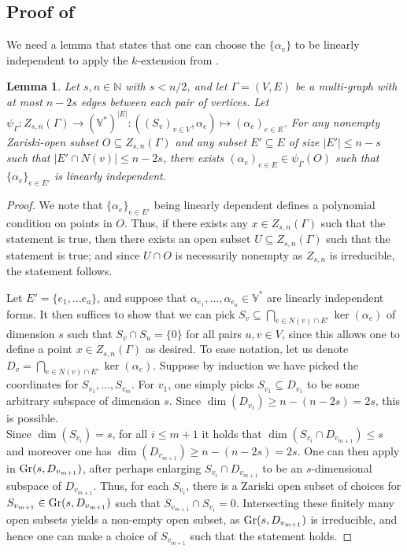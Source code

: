 \documentclass{article}
\newtheorem{lemma}[theorem]{Lemma}
\theoremstyle{definition}
\theoremstyle{remark}
\begin{document}
\subsection{Proof of }
We need a lemma that states that one can choose the $\{\alpha_e\}$ to be linearly independent to apply the $k$-extension from .
\begin{lemma}\label{lem: dense-open -> general position}
    Let $s, n\in \mathbb{N}$ with $s <n/2$, and let $\Gamma=(V, E)$ be a multi-graph with at most $n - 2s$ edges between each pair of vertices. Let $\psi_{\Gamma}: Z_{s, n}(\Gamma) \rightarrow (\mathbb{V}^{*})^{|E|}: ((S_{v})_{v\in V}, \alpha_{e}) \mapsto (\alpha_{e})_{e\in E}$. For any nonempty Zariski-open subset $O\subseteq Z_{s,n}(\Gamma)$ and any subset $E' \subseteq E$ of size $|E'| \leq  n-s$ such that $|E' \cap N(v)| \leq n - 2s$, there exists $( \alpha_{e})_{e\in E} \in \psi_{\Gamma}(O)$ such that $\{\alpha_{e}\}_{e\in E'}$ is linearly independent. 
\end{lemma}
\begin{proof}
We note that $\{\alpha_{e}\}_{e\in E'}$ being linearly dependent defines a polynomial condition on points in $O$. Thus, if there exists any $x\in Z_{s, n}(\Gamma)$ such that the statement is true, then there exists an open subset $U \subseteq Z_{s,n}(\Gamma)$ such that the statement is true; and since $U\cap O$ is necessarily nonempty as $Z_{s, n}$ is irreducible, the statement follows. 

Let $E'=\{e_1, \dots e_{a}\}$, and suppose that $\alpha_{e_1},\dots, \alpha_{e_a}\in \mathbb{V}^{*}$ are linearly independent forms. It then suffices to show that we can pick $S_{v} \subseteq \bigcap_{e\in N(v) \cap E'}\ker(\alpha_{e})$ of dimension $s$ such that $S_{v} \cap S_{u} = \{0\}$ for all pairs $u,v\in V$, since this allows one to define a point $x\in Z_{s,n}(\Gamma)$ as desired. To ease notation, let us denote $D_v= \bigcap_{e\in N(v) \cap E'}\ker(\alpha_{e})$. Suppose by induction we have picked the coordinates for $S_{v_1}, \dots, S_{v_m}$. For $v_1$, one simply picks $S_{v_1}\subseteq D_{v_1}$ to be some arbitrary subspace of dimension $s$. Since $\dim(D_{v_1}) \geq n- (n-2s) = 2s$, this is possible. \\
Since $\dim(S_{v_i}) = s$, for all $i\leq m+1$ it holds that $\dim\left(S_{v_i} \cap D_{v_{m+1}}\right) \leq s$ and moreover one has $\dim\left(D_{v_{m+1}}\right) \geq n-(n-2s) =2s$. One can then apply  in $\textup{Gr}(s , D_{v_{m+1}})$, after perhaps enlarging $S_{v_i} \cap D_{v_{m+1}}$ to be an $s$-dimensional subspace of $D_{v_{m+1}}$. Thus, for each $S_{v_i}$, there is a Zariski open subset of choices for $S_{v_{m+1}}\in \textup{Gr}(s, D_{v_{m+1}})$ such that $S_{v_{m+1}} \cap S_{v_i} = 0$. Intersecting these finitely many open subsets yields a non-empty open subset, as $\textup{Gr}(s, D_{v_{m+1}})$ is irreducible, and hence one can make a choice of $S_{v_{m+1}}$ such that the statement holds.
\end{proof}
\end{document}
